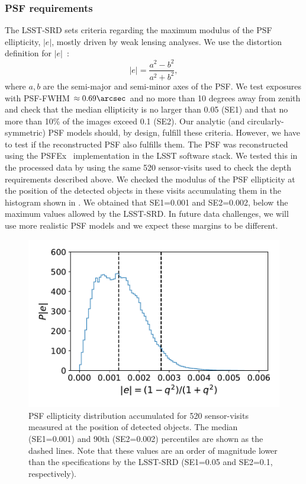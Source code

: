 \documentclass[\docopts]{\docclass}
\begin{document}
\subsubsection{PSF requirements}
\label{sssec:psf}
The LSST-SRD sets criteria regarding the maximum modulus of the PSF ellipticity, $|e|$, mostly driven by weak lensing analyses. We use the distortion definition for $|e|$~\citep{1991ApJ...380....1M}:
\begin{equation}
|e| = \frac{a^{2} - b^{2}}{a^{2}+b^{2}},
\end{equation}
where $a, b$ are the semi-major and semi-minor axes of the PSF. We test exposures with PSF-FWHM $\approx 0.69\arcsec$ and no more than 10 degrees away from zenith and check that the median ellipticity is no larger than 0.05 (SE1) and that no more than 10\% of the images exceed 0.1 (SE2). Our analytic (and circularly-symmetric) PSF models should, by design, fulfill these criteria. However, we have to test if the reconstructed PSF also fulfills them. The PSF was reconstructed using the PSFEx~\citep{2011ASPC..442..435B} implementation in the LSST software stack. We tested this in the processed data by using the same 520 sensor-visits used to check the depth requirements described above. We checked the modulus of the PSF ellipticity at the position of the detected objects in these visits accumulating them in the histogram shown in . We obtained that SE1=0.001 and SE2=0.002, below the maximum values allowed by the LSST-SRD. In future data challenges, we will use more realistic PSF models and we expect these margins to be different.
\begin{figure}
\centering
\includegraphics[width=0.85\columnwidth]{PSF_ellipticity_DC1}
\caption{PSF ellipticity distribution accumulated for 520 sensor-visits measured at the position of detected objects. The median (SE1=0.001) and 90th (SE2=0.002) percentiles are shown as the dashed lines. Note that these values are an order of magnitude lower than the specifications by the LSST-SRD (SE1=0.05 and SE2=0.1, respectively).}
\label{fig:SE1_DC1}
\end{figure}
\end{document}
